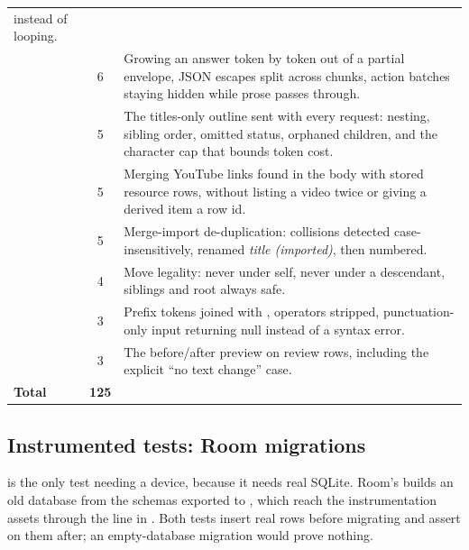 \begin{xltabular}{\linewidth}{L{4.2cm} c X}
instead of looping. \\
 & 6 &
Growing an answer token by token out of a partial envelope, JSON escapes split across chunks, action
batches staying hidden while prose passes through. \\
 & 5 &
The titles-only outline sent with every request: nesting, sibling order, omitted status, orphaned
children, and the character cap that bounds token cost. \\
 & 5 &
Merging YouTube links found in the body with stored resource rows, without listing a video twice or
giving a derived item a row id. \\
 & 5 &
Merge-import de-duplication: collisions detected case-insensitively, renamed \emph{title (imported)},
then numbered. \\
 & 4 &
Move legality: never under self, never under a descendant, siblings and root always safe. \\
 & 3 &
Prefix tokens joined with ,  operators stripped, punctuation-only input
returning null instead of a syntax error. \\
 & 3 &
The before/after preview on review rows, including the explicit ``no text change'' case. \\
\midrule
\textbf{Total} & \textbf{125} & \\
\bottomrule
\end{xltabular}

\subsection{Instrumented tests: Room migrations}

\begin{sloppypar}
 is the only test needing a device, because it needs real SQLite. Room's
 builds an old database from the schemas exported to ,
which reach the instrumentation assets through the  line in
. Both tests insert real rows before migrating and assert on them after; an
empty-database migration would prove nothing.
\end{sloppypar}

